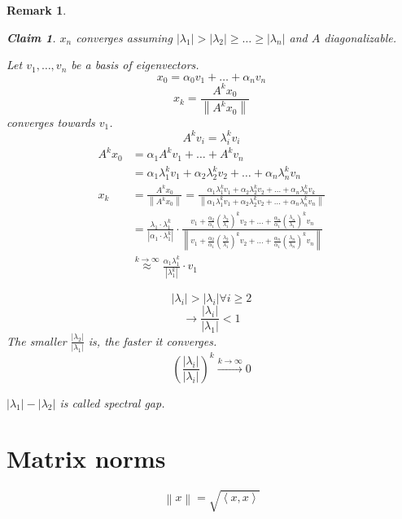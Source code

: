 \documentclass{article}
\newcounter{lecref}[section]
\numberwithin{lecref}{section}
\newtheorem*{claim}{Claim}
\newtheorem{remark}[lecref]{Remark}
\newcommand{\angel}[1]{\left\langle#1\right\rangle}
\newcommand{\norm}[1]{\left\|#1\right\|}
\newcommand{\card}[1]{\left|#1\right|}
\begin{document}
\begin{remark}
\begin{description}
    \begin{claim}
      $x_n$ converges assuming $\card{\lambda_1} > \card{\lambda_2} \geq \dots \geq \card{\lambda_n}$ and $A$ diagonalizable.
    \end{claim}
    Let $v_1, \dots, v_n$ be a basis of eigenvectors.
    \[ x_0 = \alpha_0 v_1 + \dots + \alpha_n v_n \]
    \[ x_k = \frac{A^k x_0}{\norm{A^k x_0}} \]
    converges towards $v_1$.
    \[ A^k v_i = \lambda_i^k v_i \]
    \begin{align*}
      A^k x_0 &= \alpha_1 A^k v_1 + \dots + A^k v_n \\
          &= \alpha_1 \lambda_1^k v_1 + \alpha_2 \lambda_2^k v_2 + \dots + \alpha_n \lambda_n^k v_n \\
      x_k &= \frac{A^k x_0}{\norm{A^k x_0}} = \frac{\alpha_1 \lambda_1^k v_1 + \alpha_2 \lambda_2^k v_2 + \dots + \alpha_n \lambda_n^k v_k}{\norm{\alpha_1 \lambda_1^k v_1 + \alpha_2 \lambda_2^k v_2 + \dots + \alpha_n \lambda_n^k v_n}} \\
          &= \frac{\lambda_1 \cdot \lambda_1^k}{\card{\alpha_1 \cdot \lambda_1^k}} \cdot
            \frac{v_1 + \frac{\alpha_2}{\alpha_1} \left(\frac{\lambda_2}{\lambda_1}\right)^k v_2 + \dots + \frac{\alpha_n}{\alpha_1} \left(\frac{\lambda_n}{\lambda_1}\right)^k v_n}{\norm{v_1 + \frac{\alpha_2}{\alpha_1} \left(\frac{\lambda_2}{\lambda_1}\right)^k v_2 + \dots + \frac{\alpha_n}{\alpha_1} \left(\frac{\lambda_n}{\lambda_n}\right)^k v_n}} \\
          &\overset{k \to \infty}\approx \frac{\alpha_1 \lambda_1^k}{\card{\lambda_1^k}} \cdot v_1
    \end{align*}
  \end{description}

  \[ \card{\lambda_i} > \card{\lambda_i} \forall i \geq 2 \]
  \[ \to \frac{\card{\lambda_i}}{\card{\lambda_1}} < 1 \]
  The smaller $\frac{\card{\lambda_2}}{\card{\lambda_1}}$ is, the faster it converges.
  \[ \left(\frac{\card{\lambda_i}}{\card{\lambda_i}}\right)^k \xrightarrow{k \to \infty} 0 \]

  $\card{\lambda_1} - \card{\lambda_2}$ is called \emph{spectral gap}.
\end{remark}

\section{Matrix norms}
\[ \norm{x} = \sqrt{\angel{x, x}} \]
\end{document}
